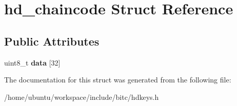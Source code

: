\hypertarget{structhd__chaincode}{\section{hd\-\_\-chaincode Struct Reference}
\label{structhd__chaincode}
}
\subsection*{Public Attributes}
\begin{DoxyCompactItemize}
\item 
\hypertarget{structhd__chaincode_a2b9955f6e9440fab05fac834aa1715ea}{uint8\-\_\-t {\bfseries data} \mbox{[}32\mbox{]}}\label{structhd__chaincode_a2b9955f6e9440fab05fac834aa1715ea}

\end{DoxyCompactItemize}


The documentation for this struct was generated from the following file\-:\begin{DoxyCompactItemize}
\item 
/home/ubuntu/workspace/include/bitc/hdkeys.\-h\end{DoxyCompactItemize}
